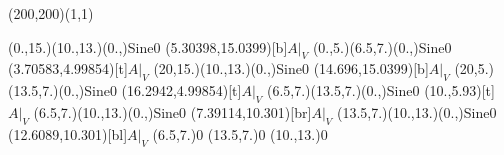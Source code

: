 \unitlength=1bp%

\begin{feynartspicture}(200,200)(1,1)

\FADiagram{}
\FAProp(0.,15.)(10.,13.)(0.,){Sine}{0}
\FALabel(5.30398,15.0399)[b]{$A|_V$}
\FAProp(0.,5.)(6.5,7.)(0.,){Sine}{0}
\FALabel(3.70583,4.99854)[t]{$A|_V$}
\FAProp(20,15.)(10.,13.)(0.,){Sine}{0}
\FALabel(14.696,15.0399)[b]{$A|_V$}
\FAProp(20,5.)(13.5,7.)(0.,){Sine}{0}
\FALabel(16.2942,4.99854)[t]{$A|_V$}
\FAProp(6.5,7.)(13.5,7.)(0.,){Sine}{0}
\FALabel(10.,5.93)[t]{$A|_V$}
\FAProp(6.5,7.)(10.,13.)(0.,){Sine}{0}
\FALabel(7.39114,10.301)[br]{$A|_V$}
\FAProp(13.5,7.)(10.,13.)(0.,){Sine}{0}
\FALabel(12.6089,10.301)[bl]{$A|_V$}
\FAVert(6.5,7.){0}
\FAVert(13.5,7.){0}
\FAVert(10.,13.){0}
\end{feynartspicture}

